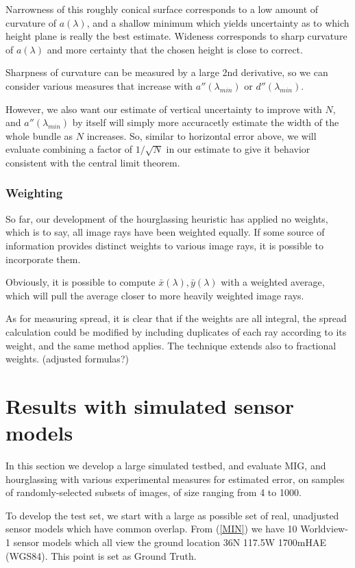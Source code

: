 \documentclass{article}
\begin{document}
Narrowness of this roughly conical surface corresponds to a low amount
of curvature of $a(\lambda)$, and a shallow minimum which yields
uncertainty as to which height plane is really the best
estimate. Wideness corresponds to sharp curvature of $a(\lambda)$ and
more certainty that the chosen height is close to correct.

Sharpness of curvature can be measured by a large 2nd derivative, so
we can consider various measures that increase with
$a''(\lambda_{min})$ or $d''(\lambda_{min})$.

However, we also want our estimate of vertical uncertainty to improve
with $N$, and $a''(\lambda_{min})$ by itself will simply more
accuracetly estimate the width of the whole bundle as $N$
increases. So, similar to horizontal error above, we will evaluate
combining a factor of $1/\sqrt{N}$ in our estimate to give it behavior
consistent with the central limit theorem.

\subsubsection{Weighting}
So far, our development of the hourglassing heuristic has applied no
weights, which is to say, all image rays have been weighted
equally. If some source of information provides distinct weights to
various image rays, it is possible to incorporate them.

Obviously, it is possible to compute
$\bar{x}(\lambda),\bar{y}(\lambda)$ with a weighted average, which
will pull the average closer to more heavily weighted image rays.

As for measuring spread, it is clear that if the weights are all
integral, the spread calculation could be modified by including
duplicates of each ray according to its weight, and the same method
applies. The technique extends also to fractional weights. (adjusted
formulas?)
 

\section{Results with simulated sensor models}\label{simulation}
In this section we develop a large simulated testbed, and evaluate
MIG, and hourglassing with various experimental measures for estimated
error, on samples of randomly-selected subsets of images, of size
ranging from 4 to 1000.

To develop the test set, we start with a large as possible set of
real, unadjusted sensor models which have common overlap. From
(\ref{MIN}) we have 10 Worldview-1 sensor models which all view the
ground location 36N 117.5W 1700mHAE (WGS84). This point is set as
Ground Truth.
\end{document}
